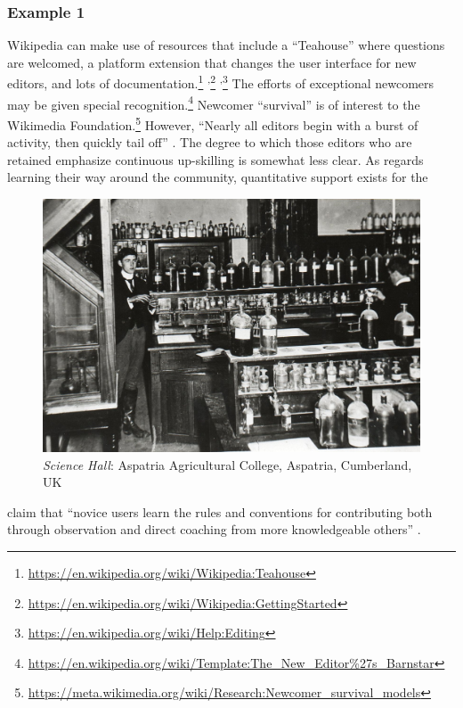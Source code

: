 \subsubsection*{Example 1} Wikipedia  can make use of resources that
include a ``Teahouse'' where questions are welcomed, a platform
extension that changes the user interface for new editors, and lots of
documentation.\footnote{\url{https://en.wikipedia.org/wiki/Wikipedia:Teahouse}}%
\textsuperscript{,}\footnote{\url{https://en.wikipedia.org/wiki/Wikipedia:GettingStarted}}%
\textsuperscript{,}\footnote{\url{https://en.wikipedia.org/wiki/Help:Editing}}
The efforts of exceptional newcomers may be given special
recognition.\footnote{\url{https://en.wikipedia.org/wiki/Template:The_New_Editor\%27s_Barnstar}}
Newcomer ``survival'' is of interest to the Wikimedia
Foundation.\footnote{\url{https://meta.wikimedia.org/wiki/Research:Newcomer_survival_models}}
However, ``Nearly all editors begin with a burst of activity, then
quickly tail off'' \cite{panciera2009wikipedians}.  The degree to
which those editors who are retained emphasize continuous up-skilling
is somewhat less clear.  As regards learning their way around the
community, quantitative support exists \cite{panciera2009wikipedians}
for the 
\begin{figure}
\vspace{-.5cm}
\begin{center}
\includegraphics[width=.45\textwidth,trim=0 20 0 20, clip=true]{The_Science_Laboratory}
\end{center}
\vspace{-.5cm}
\captionsetup{font=footnotesize,width=.45\textwidth}
\caption{\textsl{Science Hall}: Aspatria Agricultural College, Aspatria, Cumberland, UK 
\label{science-laboratory}}
\vspace{-.9cm}
\end{figure}
claim that ``novice users learn the rules and conventions
for
contributing both through observation and direct coaching from more
knowledgeable others'' \cite{bryant2005becoming}.


